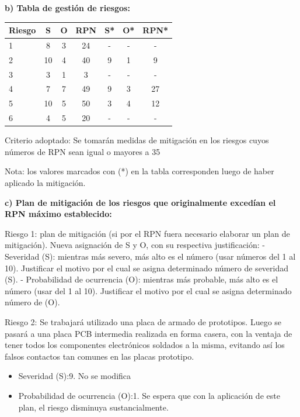 \documentclass[11pt]{charter}
\begin{document}
\textbf{b) Tabla de gestión de riesgos:}

\begin{table}[htpb]
\centering
\begin{tabularx}{\linewidth}{@{}|X|c|c|c|c|c|c|@{}}
\hline
\rowcolor[HTML]{C0C0C0} 
Riesgo & S & O & RPN & S* & O* & RPN* \\ \hline
1 & 8  & 3  &  \cellcolor[HTML]{7ab560}24   &   - &  -  &    -  \\ \hline
2 &  10 &  4 & \cellcolor[HTML]{c94848} 40  &  9  &  1  &  \cellcolor[HTML]{7ab560}9     \\ \hline
3 &  3 & 1  &   \cellcolor[HTML]{7ab560}3  &  -  &  -  &    -  \\ \hline
4 & 7  & 7  &  \cellcolor[HTML]{c94848}49   &  9  & 3   & \cellcolor[HTML]{7ab560}27     \\ \hline
5 &  10 &  5 &  \cellcolor[HTML]{c94848}50   &  3  & 4   & \cellcolor[HTML]{7ab560}12     \\ \hline
6 & 4  & 5  &   \cellcolor[HTML]{7ab560}20  &  -  &  - &   - \\ \hline
\end{tabularx}%
\end{table}

Criterio adoptado: 
Se tomarán medidas de mitigación en los riesgos cuyos números de RPN sean igual o mayores a 35

Nota: los valores marcados con (*) en la tabla corresponden luego de haber aplicado la mitigación.

\textbf{c) Plan de mitigación de los riesgos que originalmente excedían el RPN máximo establecido:}
 
Riesgo 1: plan de mitigación (si por el RPN fuera necesario elaborar un plan de mitigación).
  Nueva asignación de S y O, con su respectiva justificación:
  - Severidad (S): mientras más severo, más alto es el número (usar números del 1 al 10).
          Justificar el motivo por el cual se asigna determinado número de severidad (S).
  - Probabilidad de ocurrencia (O): mientras más probable, más alto es el número (usar del 1 al 10).
          Justificar el motivo por el cual se asigna determinado número de (O).

Riesgo 2: Se trabajará utilizado una placa de armado de prototipos. Luego se pasará a una placa PCB intermedia realizada en forma casera, con la ventaja de tener todos los componentes electrónicos soldados a la misma, evitando así los falsos contactos tan comunes en las placas prototipo.
\begin{itemize}
\item Severidad (S):9. No se modifica
\item Probabilidad de ocurrencia (O):1. Se espera que con la aplicación de este plan, el riesgo disminuya sustancialmente.
\end{itemize}
\end{document}
